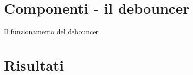\documentclass{report}
\begin{document}
\section*{Componenti - il debouncer}

Il funzionamento del debouncer

\section*{Risultati}
\end{document}
